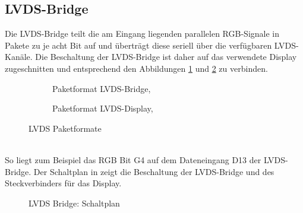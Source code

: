 \subsection{LVDS-Bridge}
Die LVDS-Bridge teilt die am Eingang liegenden parallelen RGB-Signale in Pakete zu je acht Bit auf und überträgt diese seriell über die verfügbaren LVDS-Kanäle. Die Beschaltung der LVDS-Bridge ist daher auf das verwendete Display  zugeschnitten und entsprechend den Abbildungen \ref{fig:teilb_lvds_bridge_format} und \ref{fig:teilb_lvds_display_format} zu verbinden.
\begin{figure}[htbp]
        \begin{center}
        \begin{subfigure}[htp]{0.47\textwidth}
 			\caption{Paketformat LVDS-Bridge, \cite{TI2011b}}
            \label{fig:teilb_lvds_bridge_format}
        \end{subfigure}
        \quad
        \begin{subfigure}[htp]{0.47\textwidth}
            \caption{Paketformat LVDS-Display, \cite{LG2012}}
            \label{fig:teilb_lvds_display_format}
        \end{subfigure}
		\end{center}
        \caption{LVDS Paketformate}
        \label{fig:teilb_lvds_format}
\end{figure} \\
So liegt zum Beispiel das RGB Bit G4 auf dem Dateneingang D13 der LVDS-Bridge. Der Schaltplan in  zeigt die Beschaltung der LVDS-Bridge und des Steckverbinders für das Display.\\
\begin{figure}[htbp]
		\center
        \caption{LVDS Bridge: Schaltplan}
       \label{fig:teilb_lvds_bridge_sch}
\end{figure}\\

